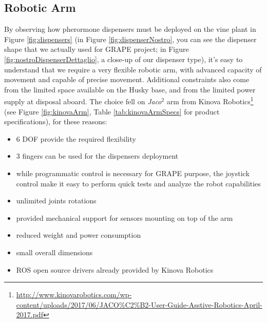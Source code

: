\subsection{Robotic Arm}\label{subsec:kinovaArm}
By observing how pherormone dispensers must be deployed on the vine plant in Figure \ref{fig:dispensers} (in Figure \ref{fig:dispenserNostro}, you can see the dispenser shape that we actually used for \ac{GRAPE} project; in Figure \ref{fig:nostroDispenserDettaglio}, a close-up of our dispenser type), it's easy to understand that we require a very flexible robotic arm, with advanced capacity of movement and capable of precise movement. Additional constraints also come from the limited space available on the Husky base, and from the limited power supply at disposal aboard. The choice fell on \textit{Jaco$^2$} arm from Kinova Robotics\footnote{\url{http://www.kinovarobotics.com/wp-content/uploads/2017/06/JACO\%C2\%B2-User-Guide-Asstive-Robotics-April-2017.pdf}}
(see Figure \ref{fig:kinovaArm}, Table \ref{tab:kinovaArmSpecs} for product specifications), for these reasons:
\begin{itemize}
	\item 6 DOF provide the required flexibility
	\item 3 fingers can be used for the dispensers deployment
	\item while programmatic control is necessary for \ac{GRAPE} purpose, the joystick control make it easy to perform quick tests and analyze the robot capabilities
	\item unlimited joints rotations
	\item provided mechanical support for sensors mounting on top of the arm 
	\item reduced weight and power consumption
	\item small overall dimensions
	\item \ac{ROS} open source drivers already provided by Kinova Robotics
\end{itemize}



